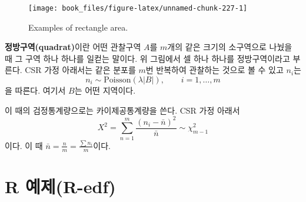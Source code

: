 \documentclass[b5paper,]{scrbook}
\theoremstyle{plain}
\theoremstyle{definition}
\numberwithin{equation}{section}
\begin{document}
\begin{figure}

{\centering \texttt{[image: book\_files/figure-latex/unnamed-chunk-227-1]} 

}

\caption{Examples of rectangle area.}\label{fig:unnamed-chunk-227}
\end{figure}

\textbf{정방구역(quadrat)}이란 어떤 관찰구역 \(A\)를 \(m\)개의 같은
크기의 소구역으로 나눴을 때 그 구역 하나 하나를 일컫는 말이다. 위
그림에서 셀 하나 하나를 정방구역이라고 부른다. CSR 가정 아래서는 같은
분포를 \(m\)번 반복하여 관찰하는 것으로 볼 수 있고 \(n_{i}\)는
\[n_{i} \sim \text{Poisson}(\lambda |B|),\qquad{i=1,\ldots, m}\] 을
따른다. 여기서 \(B\)는 어떤 지역이다.

이 때의 검정통계량으로는 카이제공통계량을 쓴다. CSR 가정 아래서
\[X^{2}=\sum_{n=1}^{m}\frac{(n_{i}-\bar{n})^{2}}{\bar{n}} \sim \chi_{m-1}^{2}\]
이다. 이 때 \(\bar{n}=\frac{n}{m}=\frac{\sum n_{i}}{m}\)이다.

\section{R 예제(R-edf)}\label{r-r-edf}
\end{document}
